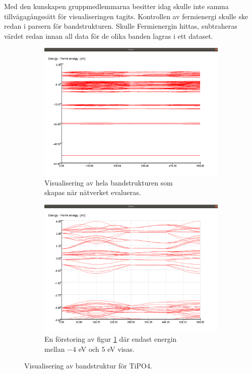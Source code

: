 Med den kunskapen gruppmedlemmarna besitter idag skulle inte samma tillvägagångssätt för visualiseringen tagits. Kontrollen av fermienergi skulle ske redan i parsern för bandstrukturen. Skulle Fermienergin hittas, subtraheras värdet redan innan all data för de olika banden lagras i ett dataset.
\begin{figure}[ht]
    \begin{subfigure}{.5\textwidth}
        \centering
        \includegraphics[width=\linewidth]{images/BandsAll.png}
        \caption{Visualisering av hela bandstrukturen som \\skapas när nätverket evalueras.}
        \label{fig:allBands}
    \end{subfigure}%
    \begin{subfigure}{.5\textwidth}
        \centering
        \includegraphics[width=\linewidth]{images/ZoomedBands.png}
        \caption{En förstoring av figur \ref{fig:allBands} där endast energin \\mellan $-4$ eV och $5$ eV visas.}
        \label{fig:zoomedBands}
    \end{subfigure}
    \caption{Visualisering av bandstruktur för TiPO4.}
    \label{fig:Band}
\end{figure}

